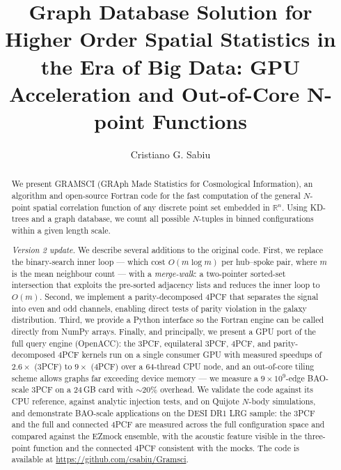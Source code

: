 \documentclass[twocolumn]{aastex701}
\begin{document}
\title{Graph Database Solution for Higher Order Spatial Statistics in the
  Era of Big Data: GPU Acceleration and Out-of-Core N-point Functions}

\author{Cristiano G. Sabiu}

\begin{abstract}
We present GRAMSCI (GRAph Made Statistics for Cosmological Information), an
algorithm and open-source Fortran code for the fast computation of the
general $N$-point spatial correlation function of any discrete point set
embedded in $\mathbb{R}^n$.  Using KD-trees and a graph database, we count
all possible $N$-tuples in binned configurations within a given length
scale.

\textit{Version 2 update.}  We describe several additions to the original
code.  First, we replace the binary-search inner loop --- which cost
$O(m\log m)$ per hub--spoke pair, where $m$ is the mean neighbour count ---
with a \textit{merge-walk}: a two-pointer sorted-set intersection that
exploits the pre-sorted adjacency lists and reduces the inner loop to
$O(m)$.  Second, we implement a parity-decomposed 4PCF that separates the
signal into even and odd channels, enabling direct tests of parity
violation in the galaxy distribution.  Third, we provide a Python interface
so the Fortran engine can be called directly from NumPy arrays.  Finally,
and principally, we present a GPU port of the full query engine (OpenACC):
the 3PCF, equilateral 3PCF, 4PCF, and parity-decomposed 4PCF kernels run on
a single consumer GPU with measured speedups of $2.6\times$ (3PCF) to
$9\times$ (4PCF) over a 64-thread CPU node, and an out-of-core tiling
scheme allows graphs far exceeding device memory --- we measure a
$9\times10^9$-edge BAO-scale 3PCF on a 24\,GB card with ${\sim}20\%$
overhead.  We validate the code against its CPU reference, against analytic
injection tests, and on Quijote $N$-body simulations, and demonstrate
BAO-scale applications on the DESI DR1 LRG sample: the 3PCF and the full
and connected 4PCF are measured across the full configuration space and
compared against the EZmock ensemble, with the acoustic feature visible in
the three-point function and the connected 4PCF consistent with the mocks.
The code is available at \url{https://github.com/csabiu/Gramsci}.
\end{abstract}

\end{document}
